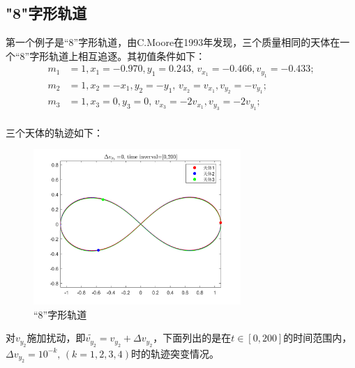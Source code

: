\documentclass{article}
\begin{document}
\subsection{"8"字形轨道}
\par 第一个例子是“8”字形轨道，由C.Moore在1993年发现\cite{sauer2018数值分析}，三个质量相同的天体在一个“8”字形轨道上相互追逐。其初值条件如下：
\begin{align*}
	m_1&= 1, x_1= -0.970 ,y_1= 0.243,\, v_{x_1}= -0.466, v_{y_1}= -0.433;\\
	m_2&=1,  x_2= -x_1 ,y_2= -y_1,	\, v_{x_2}=v_{x_1}  ,v_{y_2}= -v_{y_1};\\
	m_3&=1,  x_3= 0 ,y_3=0,\, v_{x_3}= -2v_{x_1}, v_{y_3}= -2v_{y_1};\\
\end{align*}
\par 三个天体的轨迹如下：
\begin{figure}[H]
	\centering  %
	\includegraphics[width=0.7\textwidth]{八字形轨道-初值敏感1//无扰动}
	\caption{“8”字形轨道}
	\label{8_orbit}
\end{figure}
\par 对$v_{y_2}$施加扰动，即$\tilde{v_{y_2}}=v_{y_2}+\Delta v_{y_2}$，下面列出的是在$t\in[0,200]$的时间范围内，$\Delta v_{y_2}=10^{-k},\, (k=1,2,3,4)$时的轨迹突变情况。
\end{document}
